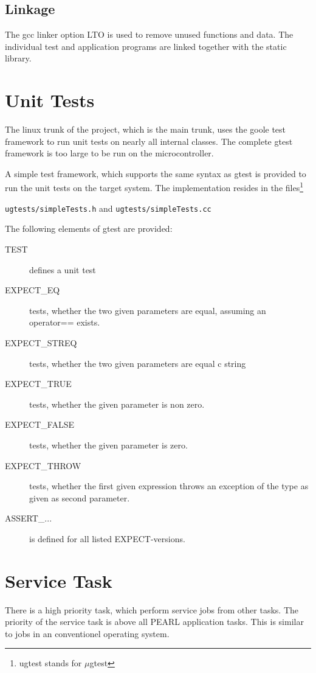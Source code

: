 \subsection{Linkage}
The gcc linker option LTO is used to remove unused functions and data. 
The individual test and application programs are linked together with 
the static library.

\section{Unit Tests}
The linux trunk of the project, which is the main trunk, uses the
goole test framework to run unit tests on nearly all internal classes.
The complete gtest framework is too large to be run on the microcontroller.

A simple test framework, which supports the same syntax as gtest is provided
to run the unit tests on the target system.
The implementation resides in the files\footnote{ugtest stands for $\mu$gtest}

 \verb|ugtests/simpleTests.h| and 
 \verb|ugtests/simpleTests.cc| 

The following elements of gtest are provided:
\begin{description}
\item[TEST] defines a unit test
\item[EXPECT\_EQ] tests, whether the two given parameters are equal, 
   assuming an operator== exists.
\item[EXPECT\_STREQ] tests, whether the two given parameters are equal c string 
\item[EXPECT\_TRUE] tests, whether the  given parameter is non zero. 
\item[EXPECT\_FALSE] tests, whether the  given parameter is zero. 
\item[EXPECT\_THROW] tests, whether the first given expression throws
   an exception of the type as given as  second parameter.
\item[ASSERT\_...] is defined for all listed EXPECT-versions. 
\end{description}

\section{Service Task}
There is a high priority task, which perform service jobs from 
other tasks.
The priority of the service task is above all PEARL application
tasks.
This is similar to jobs in an conventionel operating
system. 

